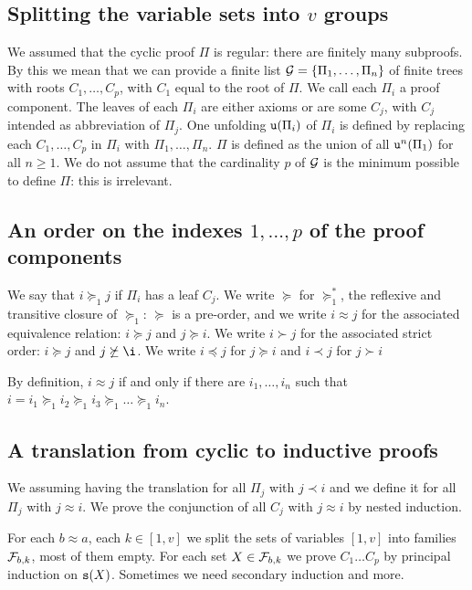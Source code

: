 \documentclass{lmcs}
\begin{document}
\subsection{Splitting the variable sets into $v$ groups}
We assumed that the cyclic proof $\Pi$ is regular: there are finitely many subproofs. 
By this we mean that we can provide
a finite list ${\mathcal G}=\{\Pi_1, \ldots, \Pi_n\}$ of finite trees with roots $C_1, \ldots, C_p$,
with $C_1$ equal to the root of $\Pi$. We call each $\Pi_i$ a proof component.
The leaves of each $\Pi_i$ are either axioms or are some  $C_j$, with $C_j$
intended as abbreviation of $\Pi_j$.
One unfolding ${\tt u}(\Pi_i)$ of
$\Pi_i$ is defined by replacing each $C_1, \ldots, C_p$ in $\Pi_i$ with $\Pi_1, \ldots, \Pi_n$.
$\Pi$ is defined as the union of all ${\tt u}^n(\Pi_1)$ for all $n \ge 1$.
We do not assume that the cardinality $p$ of ${\mathcal G}$ is the minimum possible to
define $\Pi$: this is irrelevant.


\subsection{An order on the indexes $1, \ldots, p$ of the proof components}
We say that $i \succeq_1 j$ if $\Pi_i$ has a leaf $C_j$. We write $\succeq$ for 
$\succeq_1^*$, the reflexive and transitive closure of $\succeq_1$: $\succeq$ is a pre-order,
and we write $i \approx j$ for the associated equivalence relation:
$i \succeq j$ and $j \succeq i$.
We write $i \succ j$ for the associated strict order:
$i \succeq j$ and $j \not \succeq \i$. We write $i \preceq j$ for $j \succeq i$ and
$i \prec j$ for $j \succ i$ 

By definition, $i \approx j$ if and only if there are $i_1, \ldots, i_n$ such that
$i = i_1 \succeq_1 i_2 \succeq_1 i_3 \succeq_1 \ldots \succeq_1 i_n$.


\subsection{A translation from cyclic to inductive proofs}
We assuming having the translation for all $\Pi_j$ with $j \prec i$ and we define it 
for all $\Pi_j$ with $j \approx i$. We prove the conjunction of all $C_j$ with 
$j \approx i$ by nested induction. 

For each $b \approx a$, each $k \in [1,v]$ we split the sets of variables $[1,v]$
into families ${\mathcal F}_{b,k}$, most of them empty. 
For each set $X \in {\mathcal F}_{b,k}$ we prove $C_1 \ldots C_p$ by 
principal induction on ${\tt s}(X)$. Sometimes we need secondary induction and more.
\end{document}
